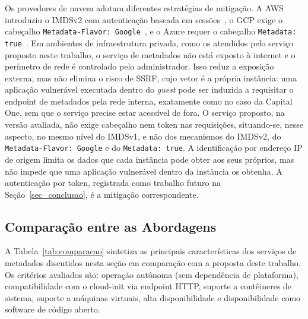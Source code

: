 Os provedores de nuvem adotam diferentes estratégias de mitigação. A AWS introduziu o IMDSv2 com autenticação baseada em sessões~\citep{aws_imdsv2_blog}, o GCP exige o cabeçalho \texttt{Metadata-Flavor: Google}~\citep{gcp_metadata}, e o Azure requer o cabeçalho \texttt{Metadata: true}~\citep{azure_imds}. Em ambientes de infraestrutura privada, como os atendidos pelo serviço proposto neste trabalho, o serviço de metadados não está exposto à internet e o perímetro de rede é controlado pelo administrador. Isso reduz a exposição externa, mas não elimina o risco de SSRF, cujo vetor é a própria instância: uma aplicação vulnerável executada dentro do \textit{guest} pode ser induzida a requisitar o endpoint de metadados pela rede interna, exatamente como no caso da Capital One, sem que o serviço precise estar acessível de fora. O serviço proposto, na versão avaliada, não exige cabeçalho nem token nas requisições, situando-se, nesse aspecto, no mesmo nível do IMDSv1, e não dos mecanismos do IMDSv2, do \texttt{Metadata-Flavor: Google} e do \texttt{Metadata: true}. A identificação por endereço IP de origem limita os dados que cada instância pode obter aos seus próprios, mas não impede que uma aplicação vulnerável dentro da instância os obtenha. A autenticação por token, registrada como trabalho futuro na Seção~\ref{sec_conclusao}, é a mitigação correspondente.

\subsection{Comparação entre as Abordagens}

A Tabela~\ref{tab:comparacao} sintetiza as principais características dos serviços de metadados discutidos nesta seção em comparação com a proposta deste trabalho. Os critérios avaliados são: operação autônoma (sem dependência de plataforma), compatibilidade com o cloud-init via endpoint HTTP, suporte a contêineres de sistema, suporte a máquinas virtuais, alta disponibilidade e disponibilidade como software de código aberto.

